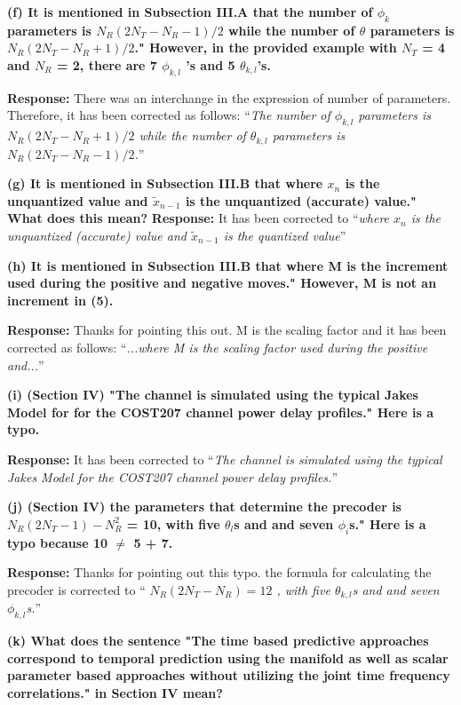 \documentclass[12pt]{letter}
\begin{document}
\textbf{(f) It is mentioned in Subsection III.A that the number of $\phi_k$ parameters is $N_R(2N_T - N_R -1 )/2$ while the number of $\theta$ parameters is $N_R(2N_T -N_R + 1)/2$." However, in the provided example with $N_T$ = 4 and $N_R$ = 2, there are 7 $\phi_{k,l}$ 's and 5 $\theta_{k,l}$'s.}

\textbf{Response:} There was an interchange in the expression of number of parameters. Therefore, it has been corrected as follows: ``\emph{The number of
$\phi_{k,l}$ parameters is $N_{R}(2N_{T} - N_{R}+1)/2$ while the number of
$\theta_{k,l}$ parameters is $N_{R}(2N_{T} - N_{R}-1)/2$.}''

\textbf{(g) It is mentioned in Subsection III.B that where $x_n$ is the unquantized value and $\tilde{x}_{n-1}$ is the unquantized (accurate) value." What does this mean?}
\textbf{Response:} It has been corrected to ``\emph{where $x_n$ is the
unquantized (accurate) value and $\tilde{x}_{n-1}$ is the quantized value}''


\textbf{(h) It is mentioned in Subsection III.B that where M is the increment used during the positive and negative moves." However, M is not an increment in (5).}

\textbf{Response:} Thanks for pointing this out. M is the scaling factor and it has been corrected as follows: ``\emph{...where M is the scaling factor used during the positive and...}''


\textbf{(i) (Section IV) "The channel is simulated using the typical Jakes Model for for the COST207 channel power delay profiles." Here is a typo.}

\textbf{Response:} It has been corrected to ``\emph{The channel is simulated using the typical Jakes Model for the COST207 channel power delay profiles.}''


\textbf{(j) (Section IV) the parameters that determine the precoder is $N_R (2N_T - 1) - N^{2}_R$ = 10, with five $\theta_l$s and and seven $\phi_i$s." Here is a typo because 10 $\neq$ 5 + 7.}

\textbf{Response:} Thanks for pointing out this typo. the formula for calculating the precoder is corrected to ``\emph{
$N_{R}(2N_{T} - N_R) = 12$ , with five $\theta_{k,l}$s and and seven
$\phi_{k,l}$s.}''


\textbf{(k) What does the sentence "The time based predictive approaches correspond to temporal prediction using the manifold as well as scalar parameter based approaches without utilizing the joint time frequency correlations." in Section IV mean?}
\end{document}

